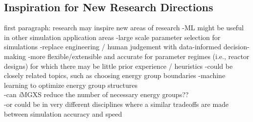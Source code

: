 
\subsection{Inspiration for New Research Directions}
\label{subsec:chap12-inspiration}

first paragraph: research may inspire new areas of research
-ML might be useful in other simulation application areas
  -large scale parameter selection for simulations
  -replace engineering / human judgement with data-informed decision-making
    -more flexible/extensible and accurate for parameter regimes (i.e., reactor designs) for which there may be little prior experience / heuristics
-could be closely related topics, such as choosing energy group boundaries
  -machine learning to optimize energy group structures \\
    -can \textit{i}MGXS reduce the number of necessary energy groups?? \\
-or could be in very different disciplines where a similar tradeoffs are made between simulation accuracy and speed